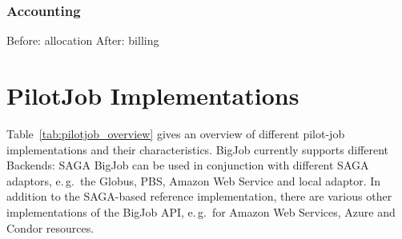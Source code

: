 \documentclass[]{article}
\begin{document}
\subsubsection{Accounting}
Before: allocation
After: billing 

\section{PilotJob Implementations}

Table~\ref{tab:pilotjob_overview} gives an overview of different pilot-job
implementations and their characteristics. BigJob currently supports different
Backends: SAGA BigJob can be used in conjunction with different SAGA adaptors,
e.\,g.\ the Globus, PBS, Amazon Web Service and local adaptor. In addition to
the SAGA-based reference implementation, there are various other implementations
of the BigJob API, e.\,g.\ for Amazon Web Services, Azure and Condor resources.

\end{document}
